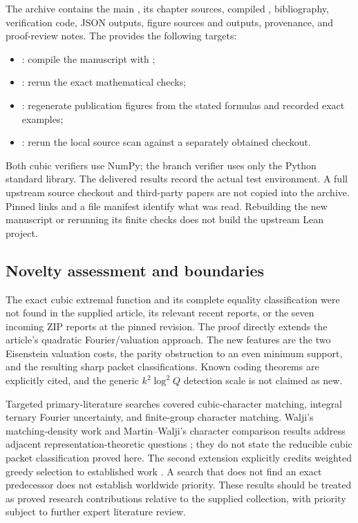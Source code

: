 The archive contains the main , its chapter sources,
compiled , bibliography, verification code, JSON outputs,
figure sources and outputs, provenance, and proof-review notes.
The  provides the following targets:
\begin{itemize}
\item {}: compile the manuscript with ;
\item {}: rerun the exact mathematical checks;
\item {}: regenerate publication figures from the stated
formulas and recorded exact examples;
\item {}: rerun the local
source scan against a separately obtained checkout.
\end{itemize}
Both cubic verifiers use NumPy; the branch verifier uses only the Python
standard library. The delivered results record the
actual test environment. A full upstream source checkout and third-party
papers are not copied into the archive. Pinned links and a file manifest
identify what was read. Rebuilding the new manuscript or rerunning its
finite checks does not build the upstream Lean project.

\subsection{Novelty assessment and boundaries}

The exact cubic extremal function and its complete equality classification
were not found in the supplied article, its relevant recent reports, or
the seven incoming ZIP reports at the pinned revision. The proof directly
extends the article's quadratic Fourier/valuation approach. The new
features are the two Eisenstein valuation costs, the parity obstruction to
an even minimum support, and the resulting sharp packet classifications.
Known coding theorems are explicitly cited, and the generic
$k^2\log^2 Q$ detection scale is not claimed as new.

Targeted primary-literature searches covered cubic-character matching,
integral ternary Fourier uncertainty, and finite-group character matching.
Walji's matching-density work and Martin--Walji's character comparison
results address adjacent representation-theoretic questions
\cite{walji2016,martinwalji2017}; they do not state the reducible cubic
packet classification proved here. The second extension explicitly
credits weighted greedy selection to established work
\cite{grinbergpetrov}. A search that does not find an exact predecessor
does not establish worldwide priority. These results should be treated
as proved research contributions relative to the supplied collection,
with priority subject to further expert literature review.

